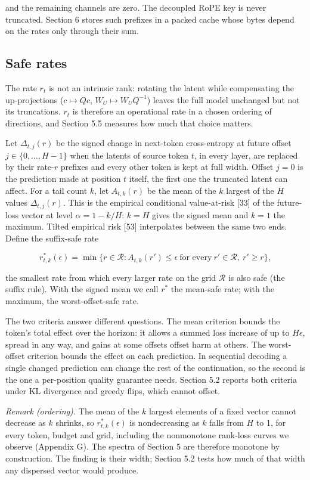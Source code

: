 \documentclass[11pt]{article}
\begin{document}
and the remaining channels are zero. The decoupled RoPE key is never truncated. Section 6 stores such prefixes in a packed cache whose bytes depend on the rates only through their sum.

\subsection{Safe rates}

The rate $r_t$ is not an intrinsic rank: rotating the latent while compensating the up-projections ($c\mapsto Qc$, $W_U\mapsto W_UQ^{-1}$) leaves the full model unchanged but not its truncations. $r_t$ is therefore an operational rate in a chosen ordering of directions, and Section 5.5 measures how much that choice matters.

Let $\Delta_{t,j}(r)$ be the signed change in next-token cross-entropy at future offset $j\in\{0,\ldots,H-1\}$ when the latents of source token $t$, in every layer, are replaced by their rate-$r$ prefixes and every other token is kept at full width. Offset $j=0$ is the prediction made at position $t$ itself, the first one the truncated latent can affect. For a tail count $k$, let $A_{t,k}(r)$ be the mean of the $k$ largest of the $H$ values $\Delta_{t,j}(r)$. This is the empirical conditional value-at-risk [33] of the future-loss vector at level $\alpha=1-k/H$: $k=H$ gives the signed mean and $k=1$ the maximum. Tilted empirical risk [53] interpolates between the same two ends. Define the suffix-safe rate

\[r^*_{t,k}(\epsilon)=\min\{r\in\mathcal R: A_{t,k}(r')\le\epsilon\ \text{for every}\ r'\in\mathcal R,\ r'\ge r\},\]

the smallest rate from which every larger rate on the grid $\mathcal R$ is also safe (the suffix rule). With the signed mean we call $r^*$ the mean-safe rate; with the maximum, the worst-offset-safe rate.

The two criteria answer different questions. The mean criterion bounds the token's total effect over the horizon: it allows a summed loss increase of up to $H\epsilon$, spread in any way, and gains at some offsets offset harm at others. The worst-offset criterion bounds the effect on each prediction. In sequential decoding a single changed prediction can change the rest of the continuation, so the second is the one a per-position quality guarantee needs. Section 5.2 reports both criteria under KL divergence and greedy flips, which cannot offset.

\textit{Remark (ordering).} The mean of the $k$ largest elements of a fixed vector cannot decrease as $k$ shrinks, so $r^*_{t,k}(\epsilon)$ is nondecreasing as $k$ falls from $H$ to 1, for every token, budget and grid, including the nonmonotone rank-loss curves we observe (Appendix G). The spectra of Section 5 are therefore monotone by construction. The finding is their width; Section 5.2 tests how much of that width any dispersed vector would produce.
\end{document}

